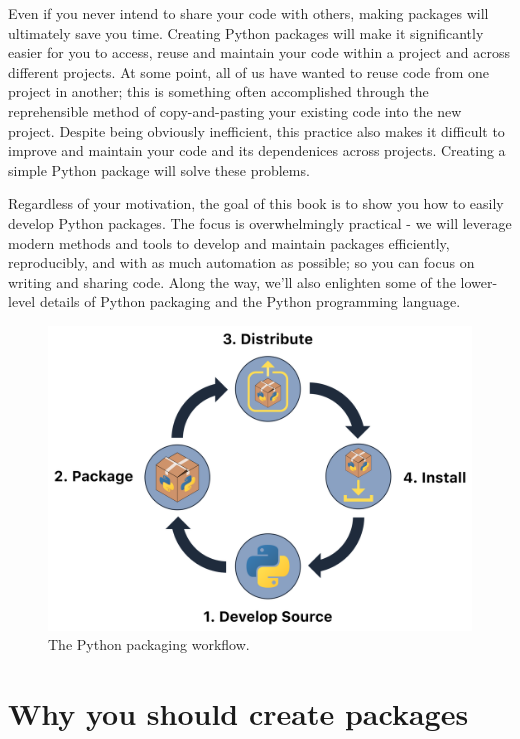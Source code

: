 \documentclass[
]{krantz}
\begin{document}
Even if you never intend to share your code with others, making packages will ultimately save you time. Creating Python packages will make it significantly easier for you to access, reuse and maintain your code within a project and across different projects. At some point, all of us have wanted to reuse code from one project in another; this is something often accomplished through the reprehensible method of copy-and-pasting your existing code into the new project. Despite being obviously inefficient, this practice also makes it difficult to improve and maintain your code and its dependenices across projects. Creating a simple Python package will solve these problems.

Regardless of your motivation, the goal of this book is to show you how to easily develop Python packages. The focus is overwhelmingly practical - we will leverage modern methods and tools to develop and maintain packages efficiently, reproducibly, and with as much automation as possible; so you can focus on writing and sharing code. Along the way, we'll also enlighten some of the lower-level details of Python packaging and the Python programming language.

\begin{figure}

{\centering \includegraphics[width=0.75\linewidth]{../images/packaging-flowchart} 

}

\caption{The Python packaging workflow.}\label{fig:01-package-flowchart}
\end{figure}

\hypertarget{why-you-should-create-packages}{%
\section{Why you should create packages}\label{why-you-should-create-packages}}
\end{document}
